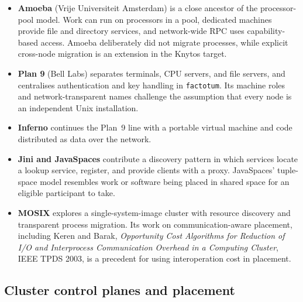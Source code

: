 \begin{itemize}
    \item \textbf{Amoeba} (Vrije Universiteit Amsterdam) is a close ancestor
        of the processor-pool model. Work can run on processors in a pool,
        dedicated machines provide file and directory services, and
        network-wide RPC uses capability-based access. Amoeba deliberately
        did not migrate processes, while explicit cross-node migration is an
        extension in the Knytos target.

    \item \textbf{Plan 9} (Bell Labs) separates terminals, CPU servers, and
        file servers, and centralises authentication and key handling in
        \texttt{factotum}. Its machine roles and network-transparent names
        challenge the assumption that every node is an independent Unix
        installation.

    \item \textbf{Inferno} continues the Plan~9 line with a portable virtual
        machine and code distributed as data over the network.

    \item \textbf{Jini and JavaSpaces} contribute a discovery pattern in
        which services locate a lookup service, register, and provide clients
        with a proxy. JavaSpaces' tuple-space model resembles work or
        software being placed in shared space for an eligible participant to
        take.

    \item \textbf{MOSIX} explores a single-system-image cluster with resource
        discovery and transparent process migration. Its work on
        communication-aware placement, including Keren and Barak,
        \emph{Opportunity Cost Algorithms for Reduction of I/O and
        Interprocess Communication Overhead in a Computing Cluster}, IEEE
        TPDS 2003, is a precedent for using interoperation cost in placement.
\end{itemize}

\subsection{Cluster control planes and placement}

